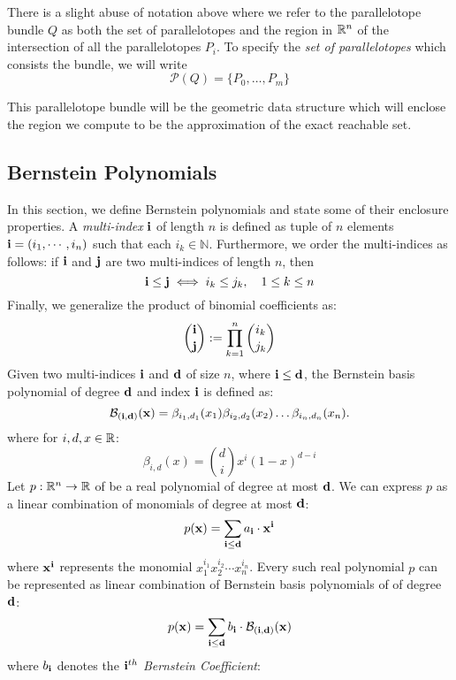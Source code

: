 \begin{remark}
There is a slight abuse of notation above where we refer to the parallelotope bundle $Q$ as both the set of parallelotopes and the region in ${\mathbb{R}}^n$ of the intersection of all the parallelotopes $P_i$. To specify the \emph{set of parallelotopes} which consists the bundle, we will write
$$
\mathcal{P}(Q) = \{P_0, \ldots, P_m\}
$$
\end{remark}

%
\noindent This parallelotope bundle will be the geometric data structure which will enclose the region we compute to be the approximation of the exact reachable set.

\subsection{Bernstein Polynomials}
\label{sec:bernstein}
In this section, we define Bernstein polynomials and state some of their enclosure properties. A \emph{multi-index} ${\bf i}$ of length $n$ is defined as tuple of $n$ elements ${\bf i} = (i_1,\cdots, i_n)$ such that each $i_k \in \mathbb{N}$. Furthermore, we order the multi-indices as follows: if ${\bf i}$ and ${\bf j}$ are two multi-indices of length $n$, then
\[
  {\bf i} \leq {\bf j} \iff i_k \leq j_k, \quad 1 \leq  k \leq n
\]
Finally, we generalize the product of binomial coefficients as:
\[
  \binom{{\bf i}}{{\bf j}} := \prod_{k=1}^n \binom{i_k}{j_k}
\]
%
Given two multi-indices ${\bf i}$ and ${\bf d}$ of size $n$, where ${\bf i} \leq {\bf d}$, the Bernstein basis polynomial of degree ${\bf d}$ and index ${\bf i}$ is defined as:
\begin{equation}
\label{eq:bernstein_basis_poly}
\mathcal{B}_{({\bf i},{\bf d})}({\bf x}) = \beta_{i_1,d_1}(x_1) \beta_{i_2,d_2}(x_2)\ldots \beta_{i_n,d_n}(x_n).
\end{equation}
%
where for $i,d,x \in {\mathbb{R}}$:
%
\begin{equation}
\beta_{i,d}(x) = \binom{d}{i}x^{i}(1-x)^{d - i}
\end{equation}
%
Let $p: {\mathbb{R}}^n \rightarrow {\mathbb{R}}$ of be a real polynomial of degree at most ${\bf d}$. We can express $p$ as a linear combination of monomials of degree at most ${\bf d}$:
\[
p({\bf x}) = \sum_{{\bf i} \leq {\bf d}} a_{\bf i} \cdot {\bf x}^{\bf i}
\]
where ${\bf x}^{\bf i}$ represents the monomial $x_1^{i_1}x_2^{i_2}\cdots x_n^{i_n}$. Every such real polynomial $p$ can be represented as linear combination of Bernstein basis polynomials of of degree ${\bf d}$:
%
\begin{equation}
  p({\bf x}) = \sum_{{\bf i} \leq {\bf d}} b_{{\bf i}} \cdot \mathcal{B}_{({\bf i},{\bf d})}({\bf x})
\end{equation}
where $b_{\bf i}$ denotes the \emph{${\bf i}^{th}$ Bernstein Coefficient}:

